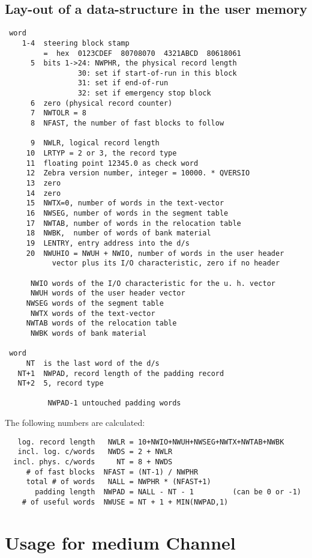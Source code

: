 {\subsection*{Lay-out of a data-structure in the user memory}

\begin{verbatim}
 word
    1-4  steering block stamp
         =  hex  0123CDEF  80708070  4321ABCD  80618061
      5  bits 1->24: NWPHR, the physical record length
                 30: set if start-of-run in this block
                 31: set if end-of-run
                 32: set if emergency stop block
      6  zero (physical record counter)
      7  NWTOLR = 8
      8  NFAST, the number of fast blocks to follow

      9  NWLR, logical record length
     10  LRTYP = 2 or 3, the record type
     11  floating point 12345.0 as check word
     12  Zebra version number, integer = 10000. * QVERSIO
     13  zero
     14  zero
     15  NWTX=0, number of words in the text-vector
     16  NWSEG, number of words in the segment table
     17  NWTAB, number of words in the relocation table
     18  NWBK,  number of words of bank material
     19  LENTRY, entry address into the d/s
     20  NWUHIO = NWUH + NWIO, number of words in the user header
           vector plus its I/O characteristic, zero if no header

      NWIO words of the I/O characteristic for the u. h. vector
      NWUH words of the user header vector
     NWSEG words of the segment table
      NWTX words of the text-vector
     NWTAB words of the relocation table
      NWBK words of bank material

 word
     NT  is the last word of the d/s
   NT+1  NWPAD, record length of the padding record
   NT+2  5, record type

          NWPAD-1 untouched padding words
\end{verbatim}
The following numbers are calculated:
\begin{verbatim}
   log. record length   NWLR = 10+NWIO+NWUH+NWSEG+NWTX+NWTAB+NWBK
   incl. log. c/words   NWDS = 2 + NWLR
  incl. phys. c/words     NT = 8 + NWDS
     # of fast blocks  NFAST = (NT-1) / NWPHR
     total # of words   NALL = NWPHR * (NFAST+1)
       padding length  NWPAD = NALL - NT - 1         (can be 0 or -1)
    # of useful words  NWUSE = NT + 1 + MIN(NWPAD,1)
\end{verbatim}

\section{Usage for medium Channel}

}
